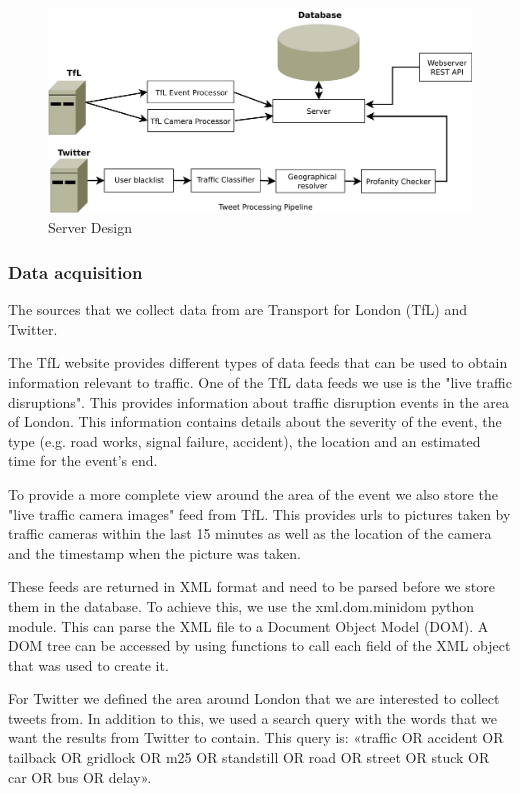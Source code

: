 \begin{figure}[htb]
\centering
\includegraphics[width=1\textwidth]{images/design/server/server.pdf}
\caption{Server Design}
\label{fig:server_design}
\end{figure}

\subsubsection{Data acquisition}
The sources that we collect data from are Transport for London (TfL) and Twitter.

The TfL website provides different types of data feeds that can be used to obtain information relevant to traffic. 
One of the TfL data feeds we use is the "live traffic disruptions". This provides information about traffic disruption events in the area of London. This information contains details about the severity of the event, the type (e.g. road works, signal failure, accident), the location and an estimated time for the event's end.

To provide a more complete view around the area of the event we also store the "live traffic camera images" feed from TfL. This provides urls to pictures taken by traffic cameras within the last 15 minutes as well as the location of the camera and the timestamp when the picture was taken.

These feeds are returned in XML format and need to be parsed before we store them in the database. To achieve this, we use the xml.dom.minidom python module. This can parse the XML file to a Document Object Model (DOM). A DOM tree can be accessed by using functions to call each field of the XML object that was used to create it.

For Twitter we defined the area around London that we are interested to collect tweets from. In addition to this, we used a search query with the words that we want the results from Twitter to contain. This query is:  «traffic OR accident OR tailback OR gridlock OR m25 OR standstill OR road OR street OR stuck OR car OR bus OR delay».

